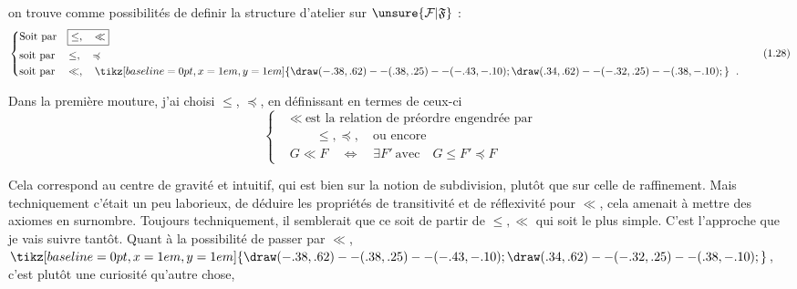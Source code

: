on trouve comme possibilités  de definir la structure d'atelier sur $\unsure{\mathcal{F}|\mathfrak{F}}$ :
\[
\left\{\begin{aligned}
 &\text{Soit par}\quad\boxed{\leq,\quad\ll}\\
 &\text{soit par}\quad\leq,\quad\preccurlyeq\\
 &\text{soit par}\quad\ll,\quad\mathrel{\tikz[baseline=0pt,x=1em,y=1em]{\draw (-.38,.62)--(.38,.25)--(-.43,-.10); \draw (.34,.62)--(-.32,.25)--(.38,-.10);}}\ .
\end{aligned}\right.
\tag*{(1.28)}
\]

Dans la première mouture, j'ai choisi $\leq$, $\preccurlyeq$, en définissant en termes de ceux-ci
\[
\left\{\begin{aligned}
 &\ll\ \text{est la relation de préordre engendrée par}\\
 &\qquad\leq,\preccurlyeq,\quad \text{ou encore}\\
 &G\ll F\quad\Longleftrightarrow\quad\exists F'\ \text{avec}\quad G\leq F'\preccurlyeq F
\end{aligned}\right.
\tag*{(1.29)}
\]

Cela correspond au centre de gravité   et intuitif, qui est bien sur la notion de subdivision, plutôt que sur celle de raffinement. Mais techniquement c'était un peu laborieux, de déduire les propriétés de transitivité et  de réflexivité pour $\ll$, cela amenait à mettre des axiomes en surnombre. Toujours techniquement, il semblerait que ce soit de partir de $\leq,\ll$ qui soit le plus simple. C'est l'approche que je vais suivre tantôt. Quant à la possibilité de passer par $\ll$, $\mathrel{\tikz[baseline=0pt,x=1em,y=1em]{\draw (-.38,.62)--(.38,.25)--(-.43,-.10); \draw (.34,.62)--(-.32,.25)--(.38,-.10);}}$, c'est plutôt une curiosité qu'autre chose,
